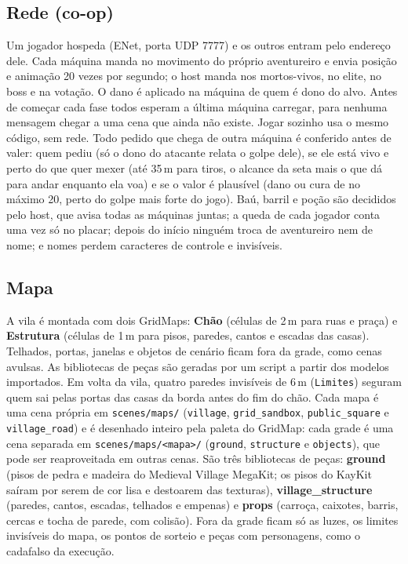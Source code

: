 \documentclass[11pt,a4paper]{article}
\begin{document}
\subsection{Rede (co-op)}

Um jogador hospeda (ENet, porta UDP 7777) e os outros entram pelo endereço dele. Cada máquina manda no movimento do próprio aventureiro e envia posição e animação 20 vezes por segundo; o host manda nos mortos-vivos, no elite, no boss e na votação. O dano é aplicado na máquina de quem é dono do alvo. Antes de começar cada fase todos esperam a última máquina carregar, para nenhuma mensagem chegar a uma cena que ainda não existe. Jogar sozinho usa o mesmo código, sem rede. Todo pedido que chega de outra máquina é conferido antes de valer: quem pediu (só o dono do atacante relata o golpe dele), se ele está vivo e perto do que quer mexer (até 35\,m para tiros, o alcance da seta mais o que dá para andar enquanto ela voa) e se o valor é plausível (dano ou cura de no máximo 20, perto do golpe mais forte do jogo). Baú, barril e poção são decididos pelo host, que avisa todas as máquinas juntas; a queda de cada jogador conta uma vez só no placar; depois do início ninguém troca de aventureiro nem de nome; e nomes perdem caracteres de controle e invisíveis.

\subsection{Mapa}

A vila é montada com dois GridMaps: \textbf{Chão} (células de 2\,m para ruas e praça) e \textbf{Estrutura} (células de 1\,m para pisos, paredes, cantos e escadas das casas). Telhados, portas, janelas e objetos de cenário ficam fora da grade, como cenas avulsas. As bibliotecas de peças são geradas por um script a partir dos modelos importados. Em volta da vila, quatro paredes invisíveis de 6\,m (\texttt{Limites}) seguram quem sai pelas portas das casas da borda antes do fim do chão. Cada mapa é uma cena própria em \texttt{scenes/maps/} (\texttt{village}, \texttt{grid\_sandbox}, \texttt{public\_square} e \texttt{village\_road}) e é desenhado inteiro pela paleta do GridMap: cada grade é uma cena separada em \texttt{scenes/maps/<mapa>/} (\texttt{ground}, \texttt{structure} e \texttt{objects}), que pode ser reaproveitada em outras cenas. São três bibliotecas de peças: \textbf{ground} (pisos de pedra e madeira do Medieval Village MegaKit; os pisos do KayKit saíram por serem de cor lisa e destoarem das texturas), \textbf{village\_structure} (paredes, cantos, escadas, telhados e empenas) e \textbf{props} (carroça, caixotes, barris, cercas e tocha de parede, com colisão). Fora da grade ficam só as luzes, os limites invisíveis do mapa, os pontos de sorteio e peças com personagens, como o cadafalso da execução.
\end{document}
